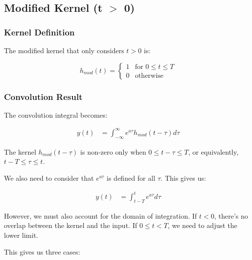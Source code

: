 \subsection{Modified Kernel (t $>$ 0)}
\subsubsection{Kernel Definition}
The modified kernel that only considers $t > 0$ is:

\begin{equation}
h_{mod}(t) = 
\begin{cases} 
1 & \text{for } 0 \leq t \leq T \\
0 & \text{otherwise}
\end{cases}
\end{equation}

\subsubsection{Convolution Result}
The convolution integral becomes:

\begin{align}
y(t) &= \int_{-\infty}^{\infty} e^{a\tau}h_{mod}(t-\tau)d\tau
\end{align}

The kernel $h_{mod}(t-\tau)$ is non-zero only when $0 \leq t-\tau \leq T$, or equivalently, $t-T \leq \tau \leq t$.

We also need to consider that $e^{a\tau}$ is defined for all $\tau$. This gives us:

\begin{align}
y(t) &= \int_{t-T}^{t} e^{a\tau}d\tau
\end{align}

However, we must also account for the domain of integration. If $t < 0$, there's no overlap between the kernel and the input. If $0 \leq t < T$, we need to adjust the lower limit.

This gives us three cases:

